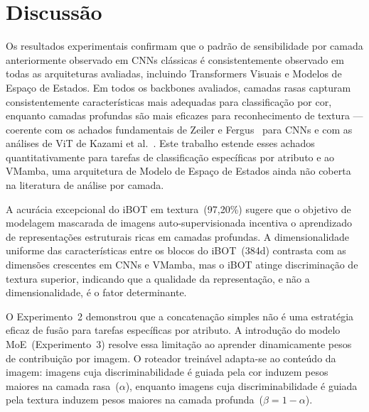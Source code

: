\documentclass[conference]{IEEEtran}
\begin{document}
\section{Discussão}

Os resultados experimentais confirmam que o padrão de sensibilidade por
camada anteriormente observado em CNNs clássicas é consistentemente
observado em todas as arquiteturas avaliadas, incluindo Transformers
Visuais e Modelos de Espaço de Estados.
Em todos os backbones avaliados, camadas rasas capturam consistentemente
características mais adequadas para classificação por cor, enquanto
camadas profundas são mais eficazes para reconhecimento de textura —
coerente com os achados fundamentais de Zeiler e Fergus~\cite{bzeiler}
para CNNs e com as análises de ViT de Kazami et al.~\cite{bkazami}.
Este trabalho estende esses achados quantitativamente para tarefas de
classificação específicas por atributo e ao VMamba, uma arquitetura de
Modelo de Espaço de Estados ainda não coberta na literatura de análise
por camada.

A acurácia excepcional do iBOT em textura~(97,20\%) sugere que o
objetivo de modelagem mascarada de imagens auto-supervisionada incentiva
o aprendizado de representações estruturais ricas em camadas profundas.
A dimensionalidade uniforme das características entre os blocos do
iBOT~(384d) contrasta com as dimensões crescentes em CNNs e VMamba, mas
o iBOT atinge discriminação de textura superior, indicando que a qualidade
da representação, e não a dimensionalidade, é o fator determinante.

O Experimento~2 demonstrou que a concatenação simples não é uma estratégia
eficaz de fusão para tarefas específicas por atributo.
A introdução do modelo MoE~(Experimento~3) resolve essa limitação ao
aprender dinamicamente pesos de contribuição por imagem.
O roteador treinável adapta-se ao conteúdo da imagem: imagens cuja
discriminabilidade é guiada pela cor induzem pesos maiores na camada
rasa~($\alpha$), enquanto imagens cuja discriminabilidade é guiada pela
textura induzem pesos maiores na camada profunda~($\beta = 1-\alpha$).
\end{document}
